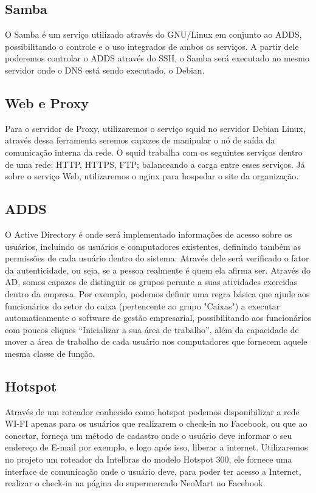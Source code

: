 \documentclass[12pt]{article}
\begin{document}
\newpage

\subsection{Samba}
O Samba é um serviço utilizado através do GNU/Linux em conjunto ao ADDS, possibilitando o controle e o uso integrados de ambos os serviços. A partir dele poderemos controlar o ADDS através do SSH, o Samba será executado no mesmo servidor onde o DNS está sendo executado, o Debian.

\subsection{Web e Proxy}
Para o servidor de Proxy, utilizaremos o serviço squid no servidor Debian Linux, através dessa ferramenta seremos capazes de manipular o nó de saída da comunicação interna da rede. O squid trabalha com os seguintes serviços dentro de uma rede: HTTP, HTTPS, FTP; balanceando a carga entre esses serviços. Já sobre o serviço Web, utilizaremos o nginx para hospedar o site da organização.

\subsection{ADDS}
O Active Directory é onde será implementado informações de acesso sobre os usuários, incluindo os usuários e computadores existentes, definindo também as permissões de cada usuário dentro do sistema. Através dele será verificado o fator da autenticidade, ou seja, se a pessoa realmente é quem ela afirma ser.\newline 
Através do AD, somos capazes de distinguir os grupos perante a suas atividades exercidas dentro da empresa. Por exemplo, podemos definir uma regra básica que ajude aos funcionários do setor do caixa (pertencente ao grupo "Caixas") a executar automaticamente o software de gestão empresarial, possibilitando aos funcionários com poucos cliques “Inicializar a sua área de trabalho”, além da capacidade de mover a área de trabalho de cada usuário nos computadores que fornecem aquele mesma classe de função.

\subsection{Hotspot}
Através de um roteador conhecido como hotspot podemos disponibilizar a rede WI-FI apenas para os usuários que realizarem o check-in no Facebook, ou que ao conectar, forneça um método de cadastro onde o usuário deve informar o seu endereço de E-mail por exemplo, e logo após isso, liberar a internet.\newline
Utilizaremos no projeto um roteador da Intelbras do modelo Hotspot 300, ele fornece uma interface de comunicação onde o usuário deve, para poder ter acesso a Internet, realizar o check-in na página do supermercado NeoMart no Facebook.
\end{document}
